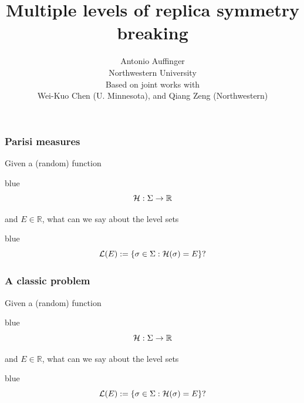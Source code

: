 \documentclass[handout]{beamer}
\title{Multiple levels of replica symmetry breaking}
\author{Antonio Auffinger\\
	Northwestern University
	\\\vspace{1cm} Based on joint works with\\
	 Wei-Kuo Chen (U. Minnesota), and Qiang Zeng (Northwestern)}
\date{}
\def\H{{\cal H}}
\begin{document}
\frame{\titlepage}



\begin{frame}\frametitle{Parisi measures}
	\noindent Given a (random) function 
\begin{color}{blue}	
	$$ \H: \Sigma \to \mathbb R $$
\end{color}	
and $E \in \mathbb R$, what can we say about the level sets
\begin{color}{blue}	
$$ \mathcal L (E) := \{ \sigma \in \Sigma : \H(\sigma) = E  \}? $$
\end{color}
\end{frame}

\begin{frame}\frametitle{A classic problem}
	\noindent Given a (random) function 
\begin{color}{blue}	
	$$ \H: \Sigma \to \mathbb R $$
\end{color}	
and $E \in \mathbb R$, what can we say about the level sets
\begin{color}{blue}	
$$ \mathcal L (E) := \{ \sigma \in \Sigma : \H(\sigma) = E  \}? $$
\end{color}
\end{frame}


	
%	
%	
%	
%	
%	
\end{document}
